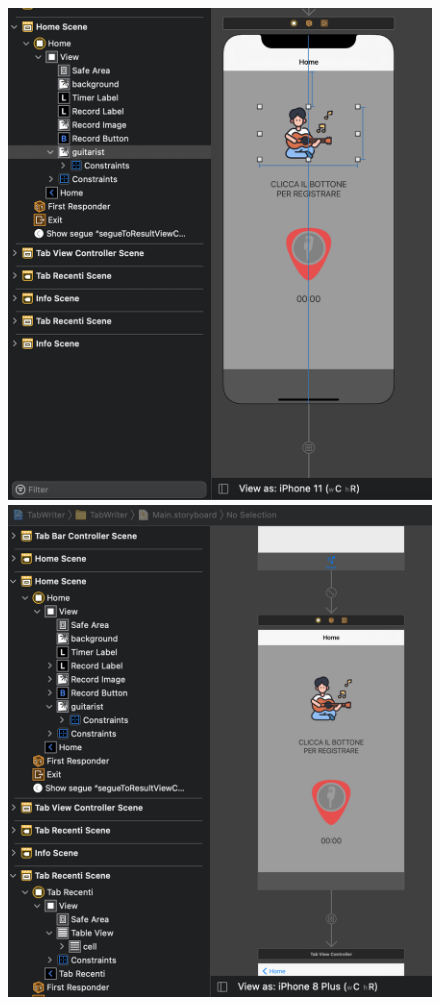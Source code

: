 \begin{figure}[H]
	\centering
	\includegraphics[scale=0.20]{./images/img2.png}
	\includegraphics[scale=0.20]{./images/img3.png}
\end{figure}
